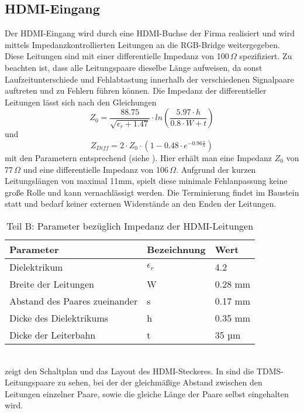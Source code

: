 \subsection{HDMI-Eingang}
\label{cha:hdmi_eingang}
Der HDMI-Eingang wird durch eine HDMI-Buchse der Firma  realisiert und wird mittels Impedanzkontrollierten Leitungen an die RGB-Bridge weitergegeben. Diese Leitungen sind mit einer differentielle Impedanz von 100\,$\Omega$ spezifiziert. Zu beachten ist, dass alle Leitungspaare dieselbe Länge aufweisen, da sonst Laufzeitunterschiede und Fehlabtastung innerhalb der verschiedenen Signalpaare auftreten und zu Fehlern führen können. Die Impedanz der differentieller Leitungen lässt sich nach den Gleichungen 
%
\begin{equation}
Z_0 = \frac{88.75}{\sqrt{\epsilon_r + 1.47}} \cdot ln\left(\frac{5.97 \cdot h}{0.8 \cdot W + t}\right)
\label{equ:z_0}
\end{equation}
%
und
%
\begin{equation}
Z_{Diff} = 2 \cdot Z_0  \cdot \left(1-0.48 \cdot e^{-0.96\frac{s}{h}}\right)
\label{equ:z_diff}
\end{equation}
%
mit den Parametern entsprechend  (siehe \cite{TI2007}). Hier erhält man eine Impedanz $Z_0$ von 77\,$\Omega$ und eine differentielle Impedanz von 106\,$\Omega$. Aufgrund der kurzen Leitungslängen von maximal 11mm, spielt diese minimale Fehlanpassung keine große Rolle und kann vernachlässigt werden. Die Terminierung findet im Baustein statt und bedarf keiner externen Widerstände an den Enden der Leitungen.
\begin{table}[h]
\begin{tabular}{|p{7cm}|p{3cm}|p{3cm}|}\hline
\rowcolor{TableBackgroundColor} 
   \textbf{Parameter} & \textbf{Bezeichnung} & \textbf{Wert}	\\ \hline
    Dielektrikum 					& $\epsilon_r$	& 4.2		\\ \hline
	Breite der Leitungen  		 	& W 			& 0.28 mm	\\ \hline
	Abstand des Paares zueinander 	& s 			& 0.17 mm 	\\ \hline
	Dicke des Dielektrikums 		& h 			& 0.35 mm 	\\ \hline 
	Dicke der Leiterbahn 			& t 			& 35 µm		\\ \hline 
\end{tabular}
\caption{Teil B: Parameter bezüglich Impedanz der HDMI-Leitungen}
\label{tab:z_parameter}
\end{table} \\
 zeigt den Schaltplan und das Layout des HDMI-Steckeres. In  sind die TDMS-Leitungspaare zu sehen, bei der der gleichmäßige Abstand zwischen den Leitungen einzelner Paare, sowie die gleiche Länge der Paare selbst eingehalten wird. 



